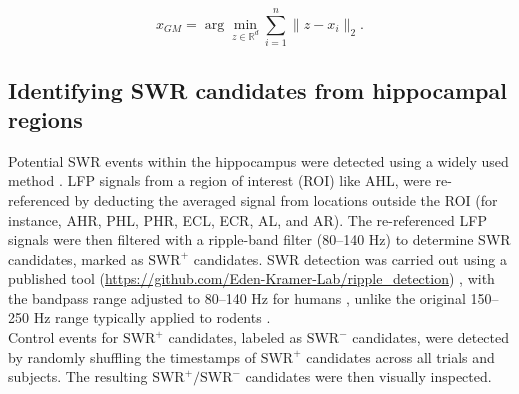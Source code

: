 \begin{equation}
x_{GM} = \arg\min_{z \in \mathbb{R}^d} \sum_{i=1}^n \|z - x_i\|_2.
\end{equation}

\indent
\subsection{Identifying SWR candidates from hippocampal regions}
Potential SWR events within the hippocampus were detected using a widely used method \cite{liu_consensus_2022}. LFP signals from a region of interest (ROI) like AHL, were re-referenced by deducting the averaged signal from locations outside the ROI (for instance, AHR, PHL, PHR, ECL, ECR, AL, and AR). The re-referenced LFP signals were then filtered with a ripple-band filter (80--140 Hz) to determine SWR candidates, marked as $\textrm{SWR}^+$ candidates. SWR detection was carried out using a published tool (\url{https://github.com/Eden-Kramer-Lab/ripple_detection}) \cite{kay_hippocampal_2016}, with the bandpass range adjusted to 80--140 Hz for humans \cite{norman_hippocampal_2019, norman_hippocampal_2021, liu_consensus_2022}, unlike the original 150--250 Hz range typically applied to rodents \cite{foster_reverse_2006, karlsson_awake_2009, carr_hippocampal_2011, pfeiffer_hippocampal_2013, jadhav_awake_2012, singer_hippocampal_2013, buzsaki_hippocampal_2015, wu_hippocampal_2017, fernandez-ruiz_long-duration_2019}.
\\
\indent
Control events for $\textrm{SWR}^+$ candidates, labeled as $\textrm{SWR}^-$ candidates, were detected by randomly shuffling the timestamps of $\textrm{SWR}^+$ candidates across all trials and subjects. The resulting $\textrm{SWR}^+/\textrm{SWR}^-$ candidates were then visually inspected.
\\
\indent
